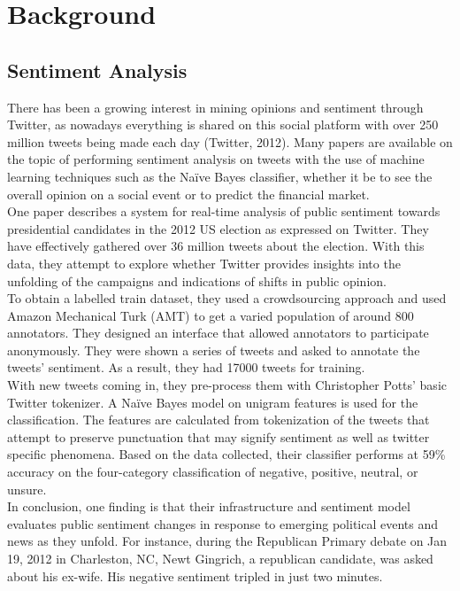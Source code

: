 \documentclass[conference]{IEEEtran}
\begin{document}
\section{Background}
	\subsection{Sentiment Analysis}
		{
			There has been a growing interest in mining opinions and sentiment through Twitter, as nowadays everything is shared on this social platform with over 250 million tweets being made each day (Twitter, 2012). Many papers are available on the topic of performing sentiment analysis on tweets with the use of machine learning techniques such as the Naïve Bayes classifier, whether it be to see the overall opinion on a social event or to predict the financial market.\\
			
			One paper describes a system for real-time analysis of public sentiment towards presidential candidates in the 2012 US election as expressed on Twitter. They have effectively gathered over 36 million tweets about the election. With this data, they attempt to explore whether Twitter provides insights into the unfolding of the campaigns and indications of shifts in public opinion.\\

			To obtain a labelled train dataset, they used a crowdsourcing approach and used Amazon Mechanical Turk (AMT) to get a varied population of around 800 annotators. They designed an interface that allowed annotators to participate anonymously. They were shown a series of tweets and asked to annotate the tweets' sentiment. As a result, they had 17000 tweets for training.\\
			
			With new tweets coming in, they pre-process them with Christopher Potts’ basic Twitter tokenizer. A Naïve Bayes model on unigram features is used for the classification. The features are calculated from tokenization of the tweets that attempt to preserve punctuation that may signify sentiment as well as twitter specific phenomena. Based on the data collected, their classifier performs at 59\% accuracy on the four-category classification of negative, positive, neutral, or unsure.\\

			In conclusion, one finding is that their infrastructure and sentiment model evaluates public sentiment changes in response to emerging political events and news as they unfold. For instance, during the Republican Primary debate on Jan 19, 2012 in Charleston, NC, Newt Gingrich, a republican candidate, was asked about his ex-wife. His negative sentiment tripled in just two minutes.
		\par}
	
\end{document}
